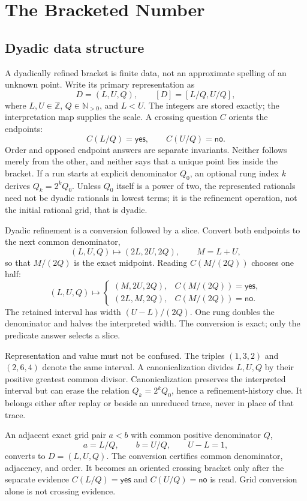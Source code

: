 \chapter{The Bracketed Number}

\section{Dyadic data structure}

A dyadically refined bracket is finite data, not an approximate spelling of an unknown point.  Write its primary
representation as
\[
             D=(L,U,Q),\qquad [D]=[L/Q,U/Q],
\]
where \(L,U\in\mathbb Z\), \(Q\in\mathbb N_{>0}\), and \(L<U\).  The integers are stored exactly; the interpretation
map supplies the scale.  A crossing question \(C\) orients the endpoints:
\[
                     C(L/Q)=\mathsf{yes},\qquad C(U/Q)=\mathsf{no}.
\]
Order and opposed endpoint answers are separate invariants.  Neither follows merely from the other, and neither says
that a unique point lies inside the bracket.  If a run starts at explicit denominator \(Q_0\), an optional rung index
\(k\) derives \(Q_k=2^kQ_0\).  Unless \(Q_0\) itself is a power of two, the represented rationals need not be dyadic
rationals in lowest terms; it is the refinement operation, not the initial rational grid, that is dyadic.

Dyadic refinement is a conversion followed by a slice.  Convert both endpoints to the next common denominator,
\[
 (L,U,Q)\longmapsto(2L,2U,2Q),\qquad M=L+U,
\]
so that \(M/(2Q)\) is the exact midpoint.  Reading \(C(M/(2Q))\) chooses one half:
\[
 (L,U,Q)\longmapsto
 \begin{cases}
 (M,2U,2Q),&C(M/(2Q))=\mathsf{yes},\\
 (2L,M,2Q),&C(M/(2Q))=\mathsf{no}.
 \end{cases}
\]
The retained interval has width \((U-L)/(2Q)\).  One rung doubles the denominator and halves the interpreted
width.  The conversion is exact; only the predicate answer selects a slice.

Representation and value must not be confused.  The triples \((1,3,2)\) and \((2,6,4)\) denote the same interval.
A canonicalization divides \(L,U,Q\) by their positive greatest common divisor.  Canonicalization preserves the
interpreted interval but can erase the relation \(Q_k=2^kQ_0\), hence a refinement-history clue.  It belongs either
after replay or beside an unreduced trace, never in place of that trace.

An adjacent exact grid pair \(a<b\) with common positive denominator \(Q\),
\[
                 a=L/Q,\qquad b=U/Q,\qquad U-L=1,
\]
converts to \(D=(L,U,Q)\).  The conversion certifies common denominator, adjacency, and order.  It becomes an oriented
crossing bracket only after the separate evidence \(C(L/Q)=\mathsf{yes}\) and \(C(U/Q)=\mathsf{no}\) is read.
Grid conversion alone is not crossing evidence.

